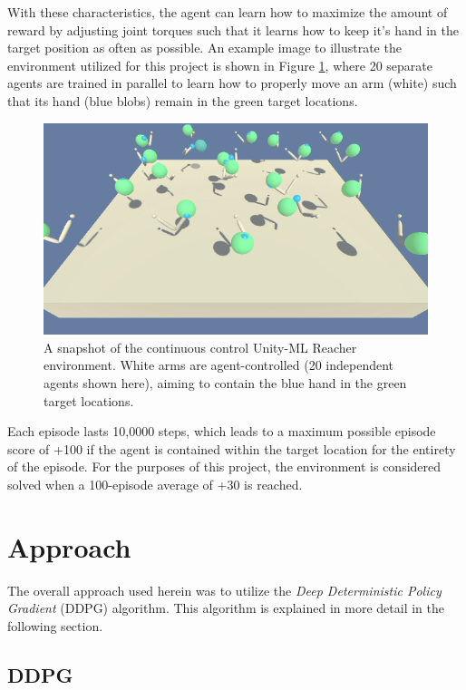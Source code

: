 \documentclass[11pt]{article}
\begin{document}
\FloatBarrier

With these characteristics, the agent can learn how to maximize the amount of reward by adjusting joint torques such that it learns how to keep it's hand in the target position as often as possible. An example image to illustrate the environment utilized for this project is shown in Figure \ref{fig:example-game-image}, where 20 separate agents are trained in parallel to learn how to properly move an arm (white) such that its hand (blue blobs) remain in the green target locations.

\begin{figure}[!ht]
	\centering
	\includegraphics[width=0.75\linewidth]{images/example-env-image.png}
	\caption{A snapshot of the continuous control Unity-ML Reacher environment. White arms are agent-controlled (20 independent agents shown here), aiming to contain the blue hand in the green target locations.}
	\label{fig:example-game-image}
\end{figure}

\FloatBarrier

Each episode lasts 10,0000 steps, which leads to a maximum possible episode score of +100 if the agent is contained within the target location for the entirety of the episode. For the purposes of this project, the environment is considered solved when a 100-episode average of +30 is reached.

\section{Approach}

The overall approach used herein was to utilize the \textit{Deep Deterministic Policy Gradient} (DDPG) algorithm. This algorithm is explained in more detail in the following section.

\subsection{DDPG}
\end{document}
